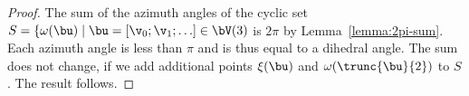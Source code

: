 \begin{proof} 
The sum of the azimuth angles of the cyclic set 
$S=\{\omega(\bu) \mid \bu =[\v_0;\v_1;\ldots]\in \bV(3)$ is $2\pi$
by Lemma~\ref{lemma:2pi-sum}.   Each azimuth angle is less than $\pi$ and is thus
equal to a dihedral angle.  The sum does not change, if we add additional points
$\xi(\bu)$ and $\omega(\trunc{\bu}{2})$ to $S$.  The result follows.
\end{proof}
%



%
%
%
%
%
%
%


